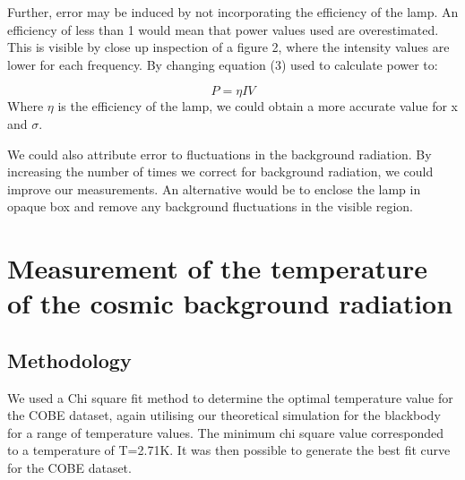 \documentclass{article}%
\begin{document}
Further, error may be induced by not incorporating the efficiency of the lamp. An efficiency of less than 1 would mean that power values used
are overestimated. This is visible by close up inspection of a figure 2, where the intensity values are lower for each frequency. By changing equation (3) used to calculate power to:

\begin{equation}
  P = \eta I V
\end{equation}
Where $\eta$ is the efficiency of the lamp, we could obtain a more accurate value for x and $\sigma$. \par

We could also attribute error to fluctuations in the background radiation. By increasing the number of times we correct for background radiation, we could improve our measurements. 
An alternative would be to enclose the lamp in opaque box and remove any background fluctuations in the visible region. \par
%

%
\section{Measurement of the temperature of the cosmic background radiation}%
\label{sec:Measurementofthetemperatureofthecosmicbackgroundradiation}%
%
\subsection{Methodology}%
\label{subsec:Methodology}%
We used a Chi square fit method to determine the optimal temperature value for the COBE dataset,
again utilising our theoretical simulation for the blackbody for a range of temperature values.
The minimum chi square value corresponded to a temperature of T=2.71K. It was then possible to generate the best fit curve for the COBE dataset.
%
\end{document}
